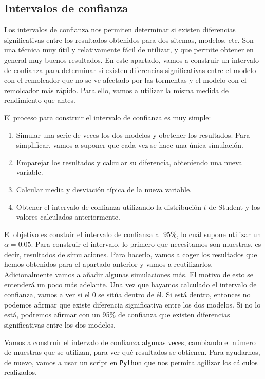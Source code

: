 \documentclass[11pt,a4paper]{article}
\begin{document}
\subsection{Intervalos de confianza}

Los intervalos de confianza nos permiten determinar si existen diferencias
significativas entre los resultados obtenidos para dos sitemas, modelos, etc.
Son una técnica muy útil y relativamente fácil de utilizar, y que permite obtener
en general muy buenos resultados. En este apartado, vamos a construir un intervalo
de confianza para determinar si existen diferencias significativas entre el
modelo con el remolcador que no se ve afectado por las tormentas y el modelo
con el remolcador más rápido. Para ello, vamos a utilizar la misma medida
de rendimiento que antes.

El proceso para construir el intervalo de confianza es muy simple:

\begin{enumerate}
	\item Simular una serie de veces los dos modelos y obetener los resultados.
	Para simplificar, vamos a suponer que cada vez se hace una única simulación.
	\item Emparejar los resultados y calcular su diferencia, obteniendo una nueva
	variable.
	\item Calcular media y desviación típica de la nueva variable.
	\item Obtener el intervalo de confianza utilizando la distribución $t$ de Student
	y los valores calculados anteriormente.
\end{enumerate}

El objetivo es constuir el intervalo de confianza al 95\%, lo cuál supone
utilizar un $\alpha=0.05$. Para construir el intervalo, lo primero que necesitamos
son muestras, es decir, resultados de simulaciones. Para hacerlo, vamos a coger
los resultados que hemos obtenidos para el apartado anterior y vamos a reutilizarlos.
Adicionalmente vamos a añadir algunas simulaciones más. El motivo de esto se entenderá
un poco más adelante. Una vez que hayamos calculado el intervalo de confianza,
vamos a ver si el 0 se sitúa dentro de él. Si está dentro, entonces no podemos
afirmar que existe diferencia significativa entre los dos modelos. Si no lo está,
podremos afirmar con un 95\% de confianza que existen diferencias significativas
entre los dos modelos.

Vamos a construir el intervalo de confianza algunas veces, cambiando el número
de muestras que se utilizan, para ver qué resultados se obtienen. Para ayudarnos,
de nuevo, vamos a usar un script en \texttt{Python} que nos permita agilizar
los cálculos realizados.
\end{document}
